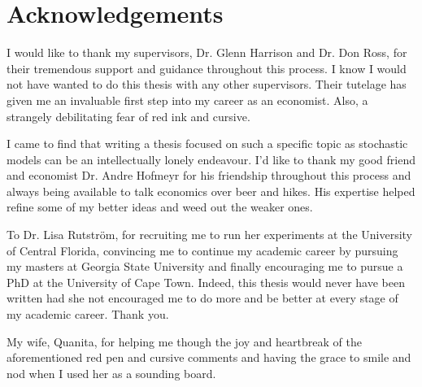 \documentclass[../main.tex]{subfiles}
\begin{document}
\doublespacing
\singlespacing
\chapter*{Acknowledgements}
\doublespacing

I would like to thank my supervisors, Dr. Glenn Harrison and Dr. Don Ross, for their tremendous support and guidance throughout this process.
I know I would not have wanted to do this thesis with any other supervisors.
Their tutelage has given me an invaluable first step into my career as an economist.
Also, a strangely debilitating fear of red ink and cursive.

I came to find that writing a thesis focused on such a specific topic as stochastic models can be an intellectually lonely endeavour.
I'd like to thank my good friend and economist Dr. Andre Hofmeyr for his friendship throughout this process and always being available to talk economics over beer and hikes.
His expertise helped refine some of my better ideas and weed out the weaker ones.

To Dr. Lisa Rutstr\"{o}m, for recruiting me to run her experiments at the University of Central Florida, convincing me to continue my academic career by pursuing my masters at Georgia State University and finally encouraging me to pursue a PhD at the University of Cape Town.
Indeed, this thesis would never have been written had she not encouraged me to do more and be better at every stage of my academic career.
Thank you.

My wife, Quanita, for helping me though the joy and heartbreak of the aforementioned red pen and cursive comments and having the grace to smile and nod when I used her as a sounding board.
\end{document}
